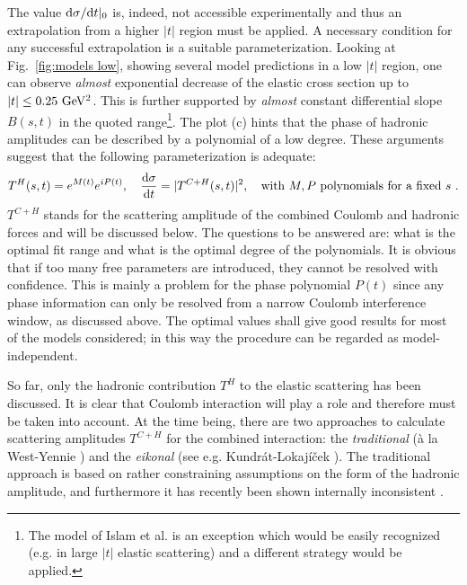 \documentclass{desyproc}
\def\si{\sigma}
\def\un#1{\ {\rm #1}}
\def\d{{\rm d}}
\begin{document}
The value $\d\si/\d t|_0$ is, indeed, not accessible experimentally and thus an extrapolation from a higher $|t|$ region must be applied. A necessary condition for any successful extrapolation is a suitable parameterization. Looking at Fig.~\ref{fig:models low}, showing several model predictions in a low $|t|$ region, one can observe {\em almost} exponential decrease of the elastic cross section up to $|t| \leq 0.25\un{GeV^2}$. This is further supported by {\em almost} constant differential slope $B(s, t)$ in the quoted range\footnote{\label{fn:islam}
The model of Islam et al. is an exception which would be easily recognized (e.g. in large $|t|$ elastic scattering) and a different strategy would be applied.
}. The plot (c) hints that the phase of hadronic amplitudes can be described by a polynomial of a low degree. These arguments suggest that the following parameterization is adequate:
\begin{equation}
T^H(s, t) = e^{M(t)} e^{i P(t)},\quad {\d\si\over\d t} = |T^{C+H}(s, t)|^2,\quad\hbox{with }M, P\hbox{ polynomials for a fixed }s\ .
\label{eq:param}
\end{equation}
$T^{C+H}$ stands for the scattering amplitude of the combined Coulomb and hadronic forces and will be discussed below. The questions to be answered are: what is the optimal fit range and what is the optimal degree of the polynomials. It is obvious that if too many free parameters are introduced, they cannot be resolved with confidence. This is mainly a problem for the phase polynomial $P(t)$ since any phase information can only be resolved from a narrow Coulomb interference window, as discussed above. The optimal values shall give good results for most of the models considered; in this way the procedure can be regarded as model-independent.

So far, only the hadronic contribution $T^H$ to the elastic scattering has been discussed. It is clear that Coulomb interaction will play a role and therefore must be taken into account. At the time being, there are two approaches to calculate scattering amplitudes $T^{C+H}$ for the combined interaction: the {\em traditional} (\`a la West-Yennie \cite{wy}) and the {\em eikonal} (see e.g. Kundr\' at-Lokaj\' i\v cek \cite{kl}). The traditional approach is based on rather constraining assumptions on the form of the hadronic amplitude, and furthermore it has recently been shown internally inconsistent \cite{wy inconsistent}.


\end{document}
